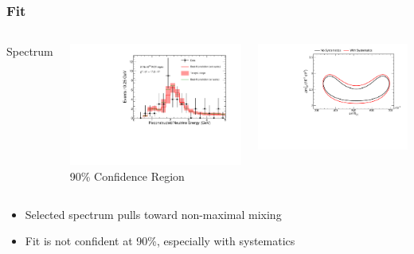 \documentclass[10pt,professionalfonts,xcolor=table]{beamer}
\begin{document}
\begin{frame}
\frametitle{Fit}
\begin{columns}[c]
 \centering
 \textcolor{custom_red}{Spectrum}

  \includegraphics[angle=-90, width=1\textwidth]{figures/results/spectrum_fit_systs.pdf}
 \centering
  \textcolor{custom_red}{90\% Confidence Region}

  \includegraphics[angle=-90, width=1\textwidth]{figures/results/fd_extrap_contour_full_syst.pdf}
\end{columns}
\gap
\begin{itemize}
\item Selected spectrum pulls toward non-maximal mixing
\item Fit is not confident at 90\%, especially with systematics
\end{itemize}
\end{frame}
\end{document}
